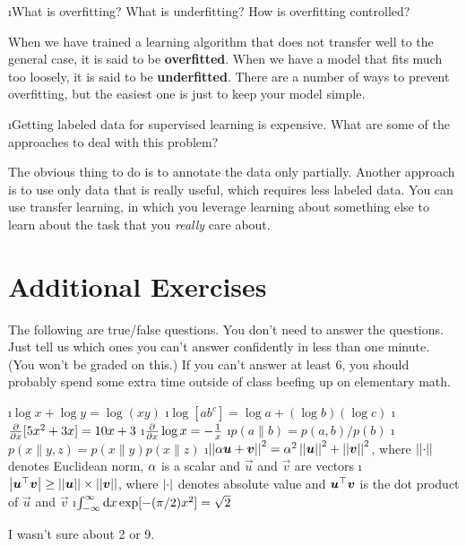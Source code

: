 \documentclass[fleqn]{article}
\begin{document}
\i What is overfitting? What is underfitting? How is overfitting controlled?
 \begin{solution}
   When we have trained a learning algorithm that does not transfer well to the general case, it is said to be \textbf{overfitted}. When we have a model that fits much too loosely, it is said to be \textbf{underfitted}. There are a number of ways to prevent overfitting, but the easiest one is just to keep your model simple.
 \end{solution}
\i Getting labeled data for supervised learning is expensive. What are some of the 
   approaches to deal with this problem?
 \begin{solution}
   The obvious thing to do is to annotate the data only partially. Another approach is to use only data that is really useful, which requires less labeled data. You can use transfer learning, in which you leverage learning about something else to learn about the task that you \textit{really} care about.
 \end{solution}

\ene

\section{Additional Exercises}


The following are true/false questions.  You don't need to answer the
questions.  Just tell us which ones you can't answer confidently in
less than one minute.  (You won't be graded on this.)  If you can't
answer at least $6$, you should probably spend some extra time outside
of class beefing up on elementary math.  

\bee
\i $\log x + \log y = \log (xy)$
\i $\log [ab^c] = \log a + (\log b) (\log c)$
\i $\frac \partial {\partial x} [5x^2 + 3x] = 10x + 3$
\i $\frac \partial {\partial x} \log x = - \frac 1 x$
\i $p(a \| b) = p(a,b) / p(b)$
\i $p(x \| y,z) = p(x \| y) p(x \| z)$
\i $\left\vert\left\vert \alpha \boldsymbol{u} + \boldsymbol{v} \right\vert\right\vert^2 = \alpha^2 \left\vert\left\vert \boldsymbol{u} \right\vert\right\vert^2 + \left\vert\left\vert \boldsymbol{v} \right\vert\right\vert^2$, where $\left\vert\left\vert \cdot \right\vert\right\vert$ denotes Euclidean norm, $\alpha$ is a scalar and $\vec u$ and $\vec v$ are vectors
\i $\left\vert \boldsymbol{u}{}^\top\boldsymbol{v} \right\vert \geq \left\vert\left\vert \boldsymbol{u} \right\vert\right\vert \times \left\vert\left\vert \boldsymbol{v} \right\vert\right\vert$, where $\left\vert \cdot \right\vert$ denotes absolute value and $\boldsymbol{u}{}^\top\boldsymbol{v}$ is the dot product of $\vec u$ and $\vec v$
\i $\int_{-\infty}^{\infty} \textrm{d} x \exp[-(\pi/2) x^2] = \sqrt{2}$
\ene

 \begin{solution}
   I wasn't sure about 2 or 9.
 \end{solution}
\end{document}
